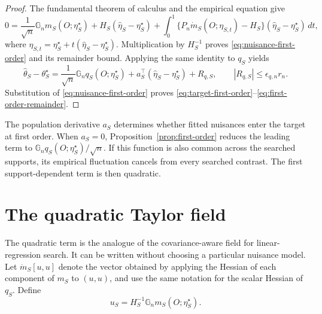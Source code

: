 \documentclass[a4paper,10pt,english]{article}
\begin{document}
\begin{proof}
The fundamental theorem of calculus and the empirical equation give
\begin{equation*}
 0=\frac1{\sqrt n}\mathbb G_nm_S(O;\eta_S^\star)
   +H_S(\hat\eta_S-\eta_S^\star)
   +\int_0^1\{P_n\dot m_S(O;\eta_{S,t})-H_S\}
      (\hat\eta_S-\eta_S^\star)\,dt,
\end{equation*}
where $\eta_{S,t}=\eta_S^\star+t(\hat\eta_S-\eta_S^\star)$.
Multiplication by $H_S^{-1}$ proves \eqref{eq:nuisance-first-order} and
its remainder bound.  Applying the same identity to $q_S$ yields
\begin{equation*}
 \hat\theta_S-\theta_S^\star
 =\frac1{\sqrt n}\mathbb G_nq_S(O;\eta_S^\star)
  +a_S^\top(\hat\eta_S-\eta_S^\star)+R_{q,S},
 \qquad |R_{q,S}|\le\epsilon_{q,n}r_n.
\end{equation*}
Substitution of \eqref{eq:nuisance-first-order} proves
\eqref{eq:target-first-order}--\eqref{eq:first-order-remainder}.
\end{proof}

The population derivative $a_S$ determines whether fitted nuisances enter
the target at first order.  When $a_S=0$, Proposition~\ref{prop:first-order}
reduces the leading term to $\mathbb G_n
q_S(O;\eta_S^\star)/\sqrt n$.  If this function is also common across the
searched supports, its empirical fluctuation cancels from every searched
contrast.  The first support-dependent term is then quadratic.

\section{The quadratic Taylor field}

The quadratic term is the analogue of the covariance-aware field for
linear-regression search.  It can be written without choosing a particular
nuisance model.  Let $\ddot m_S[u,u]$ denote the vector obtained by applying
the Hessian of each component of $m_S$ to $(u,u)$, and use the same notation
for the scalar Hessian of $q_S$.  Define
\begin{equation}\label{eq:u-definition}
        u_S=H_S^{-1}\mathbb G_nm_S(O;\eta_S^\star).
\end{equation}
\end{document}
